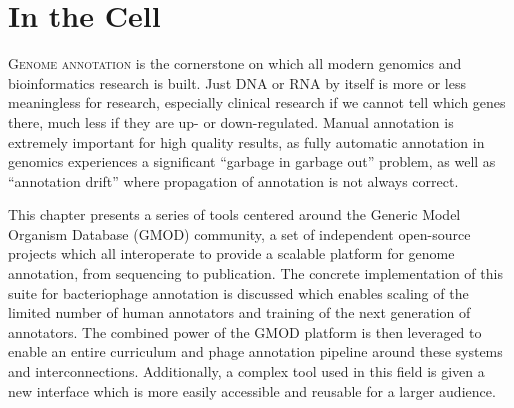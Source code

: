 

\chapter{In the Cell}\label{chapter:annotation}
\setcounter{figure}{-1}
\setcounter{table}{-1}
\setcounter{section}{-1}
\setcounter{NAT@ctr}{-1}

\setcounter{figure}{-1}
\setcounter{table}{-1}
\setcounter{section}{-1}

\lettrine[lines=3,lraise=-0.1,lhang=0.3,findent=0.5em,nindent=0em]{\textcolor{hexy-red}{\fontEBGaramondInitials{}G}}{\color{hexy-red}enome annotation} is the cornerstone on which all modern genomics and bioinformatics research is built. Just DNA or RNA by itself is more or less meaningless for research, especially clinical research if we cannot tell which genes there, much less if they are up- or down-regulated. Manual annotation is extremely important for high quality results, as fully automatic annotation in genomics experiences a significant ``garbage in garbage out'' problem, as well as ``annotation drift'' where propagation of annotation is not always correct.

This chapter presents a series of tools centered around the Generic Model Organism Database (GMOD) community, a set of independent open-source projects which all interoperate to provide a scalable platform for genome annotation, from sequencing to publication. The concrete implementation of this suite for bacteriophage annotation is discussed which enables scaling of the limited number of human annotators and training of the next generation of annotators.
The combined power of the GMOD platform is then leveraged to enable an entire curriculum and phage annotation pipeline around these systems and interconnections. Additionally, a complex tool used in this field is given a new interface which is more easily accessible and reusable for a larger audience.

